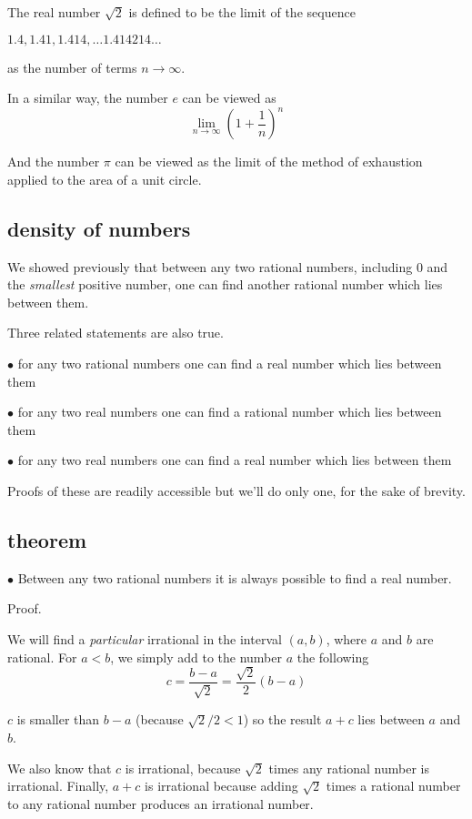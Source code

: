 \documentclass[11pt, oneside]{article}
\begin{document}
The real number $\sqrt{2}$ is defined to be the limit of the sequence 

$1.4, 1.41, 1.414, \dots 1.414214 \dots$ 

as the number of terms $n \rightarrow \infty$.

In a similar way, the number $e$ can be viewed as
\[ \lim_{n \rightarrow \infty} (1 + \frac{1}{n})^n \]

And the number $\pi$ can be viewed as the limit of the method of exhaustion applied to the area of a unit circle.

\subsection*{density of numbers}

We showed previously that between any two rational numbers, including $0$ and the \emph{smallest} positive number, one can find another rational number which lies between them.

Three related statements are also true.

$\bullet$ for any two rational numbers one can find a real number which lies between them

$\bullet$ for any two real numbers one can find a rational number which lies between them

$\bullet$ for any two real numbers one can find a real number which lies between them

Proofs of these are readily accessible but we'll do only one, for the sake of brevity.

\subsection*{theorem}

$\bullet$  Between any two rational numbers it is always possible to find a real number.

Proof.

We will find a \emph{particular} irrational in the interval $(a,b)$, where $a$ and $b$ are rational.  For $a < b$, we simply add to the number $a$ the following
\[ c = \frac{b - a}{\sqrt{2}} = \frac{\sqrt{2}}{2}(b - a) \]

$c$ is smaller than $b - a$ (because $\sqrt{2}/2 < 1$) so the result $a + c$ lies between $a$ and $b$.  

We also know that $c$ is irrational, because $\sqrt{2}$ times any rational number is irrational.  Finally, $a + c$ is irrational because adding $\sqrt{2}$ times a rational number to any rational number produces an irrational number.
\end{document}
